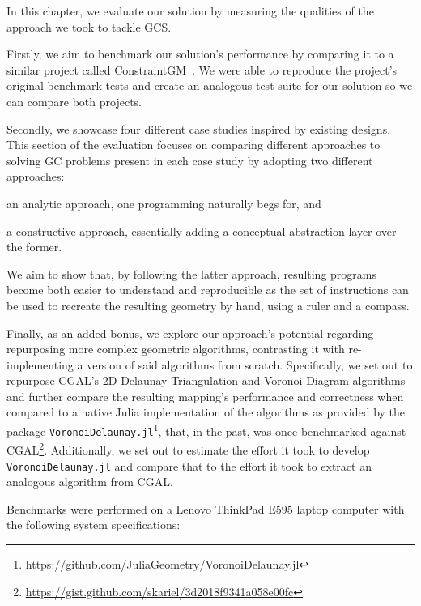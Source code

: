 %
\label{chap:eval}
\cleardoublepage{}

\noindent In this chapter, we evaluate our solution by measuring the qualities
of the approach we took to tackle \ac{GCS}.

Firstly, we aim to benchmark our solution's performance by comparing it to a
similar project called ConstraintGM~\cite{Pinheiro:2016:MGR}.  We were able to
reproduce the project's original benchmark tests and create an analogous test
suite for our solution so we can compare both projects.

Secondly, we showcase four different case studies inspired by existing designs.
This section of the evaluation focuses on comparing different approaches to
solving \ac{GC} problems present in each case study by adopting two different
approaches: 
\begin{enumerate*}[label= (\arabic*)]
  \item an analytic approach, one programming naturally begs for, and 
  \item a constructive approach, essentially adding a conceptual abstraction
  layer over the former.
\end{enumerate*}
We aim to show that, by following the latter approach, resulting programs become
both easier to understand and reproducible as the set of instructions can be
used to recreate the resulting geometry by hand, using a ruler and a compass.

Finally, as an added bonus, we explore our approach's potential regarding
repurposing more complex geometric algorithms, contrasting it with
re-implementing a version of said algorithms from scratch.  Specifically, we set
out to repurpose \ac{CGAL}'s 2D Delaunay Triangulation and Voronoi Diagram
algorithms and further compare the resulting mapping's performance and
correctness when compared to a native Julia implementation of the algorithms as
provided by the package
\texttt{VoronoiDelaunay.jl}\footnote{\url{https://github.com/JuliaGeometry/VoronoiDelaunay.jl}},
that, in the past, was once benchmarked against
\ac{CGAL}\footnote{\url{https://gist.github.com/skariel/3d2018f9341a058e00fc}}.
Additionally, we set out to estimate the effort it took to develop
\texttt{VoronoiDelaunay.jl} and compare that to the effort it took to extract an
analogous algorithm from \ac{CGAL}.

Benchmarks were performed on a Lenovo{\textregistered}
ThinkPad{\textregistered} E595 laptop computer with the following
system specifications:


